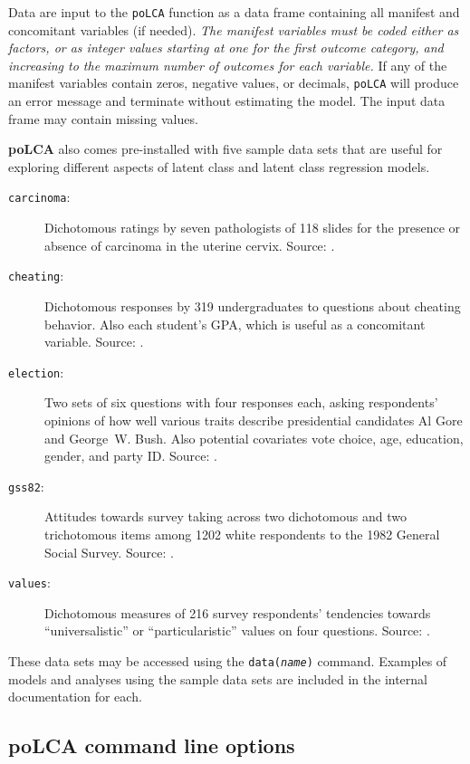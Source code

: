 \documentclass[letterpaper,12pt]{article}
\begin{document}
Data are input to the \texttt{poLCA} function as a data frame containing all manifest and concomitant variables (if needed). \emph{The manifest variables must be coded either as factors, or as integer values starting at one for the first outcome category, and increasing to the maximum number of outcomes for each variable.}  If any of the manifest variables contain zeros, negative values, or decimals, \texttt{poLCA} will produce an error message and terminate without estimating the model. The input data frame may contain missing values.

\textbf{poLCA} also comes pre-installed with five sample data sets that are useful for exploring different aspects of latent class and latent class regression models.
\begin{description}
    \item [\texttt{carcinoma}:] Dichotomous ratings by seven pathologists of 118 slides for the presence or absence of carcinoma in the uterine cervix. Source: \citet[542]{Agresti2002}.
    \item [\texttt{cheating}:] Dichotomous responses by 319 undergraduates to questions about cheating behavior. Also each student's GPA, which is useful as a concomitant variable.  Source: \citet[33 and 85]{Dayton1998}.
    \item [\texttt{election}:] Two sets of six questions with four responses each, asking respondents' opinions of how well various traits describe presidential candidates Al Gore and George~W. Bush. Also potential covariates vote choice, age, education, gender, and party ID. Source: \citet{NES2000}.
    \item [\texttt{gss82}:] Attitudes towards survey taking across two dichotomous and two trichotomous items among 1202 white respondents to the 1982 General Social Survey. Source: \citet[30]{McCutcheon1987}.
    \item [\texttt{values}:] Dichotomous measures of 216 survey respondents' tendencies towards ``universalistic'' or ``particularistic'' values on four questions. Source: \citet{Goodman1974}.
\end{description}
These data sets may be accessed using the \texttt{data(\emph{name})} command.  Examples of models and analyses using the sample data sets are included in the internal documentation for each.

\subsection{\textbf{poLCA} command line options} \label{s.cmdline}
\end{document}
